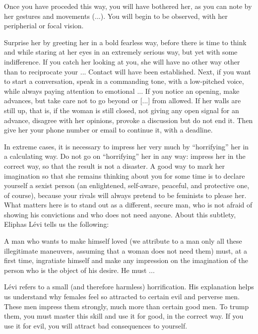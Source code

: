 \par Once you have proceded this way, you will have bothered her, as you can note by her gestures and movements (...). You will begin to be observed, with her peripherial or focal vision.
 
\par Surprise her by greeting her in a bold fearless way, before there is time to think and while staring at her eyes in an extremely serious way, but yet with some indifference. If you catch her looking at you, she will have no other way other than to reciprocate your ... Contact will have been established. Next, if you want to start a conversation, speak in a commanding tone, with a low-pitched voice, while always paying attention to emotional ... If you notice an opening, make advances, but take care not to go beyond or [...] from allowed. If her walls are still up, that is, if the woman is still closed, not giving any open signal for an advance, disagree with her opinions, provoke a discussion but do not end it. Then give her your phone number or email to continue it, with a deadline.
 
\par In extreme cases, it is necessary to impress her very much by \enquote{horrifying} her in a calculating way. Do not go on \enquote{horrifying} her in any way: impress her in the correct way, so that the result is not a disaster. A good way to mark her imagination so that she remains thinking about you for some time is to declare yourself a sexist person (an enlightened, self-aware, peaceful, and protective one, of course), because your rivals will always pretend to be feminists to please her. What matters here is to stand out as a different, secure man, who is not afraid of showing his convictions and who does not need anyone. About this subtlety, Eliphas Lévi tells us the following:

\begin{displayquote}
	A man who wants to make himself loved (we attribute to a man only all these illegitimate maneuvers, assuming that a woman does not need them) must, at a first time, ingratiate himself and make any impression on the imagination of the person who is the object of his desire. He must ...
\end{displayquote}
 
\par Lévi refers to a small (and therefore harmless) horrification. His explanation helps us understand why females feel so attracted to certain evil and perverse men. These men impress them strongly, much more than certain good men. To trump them, you must master this skill and use it for good, in the correct way. If you use it for evil, you will attract bad consequences to yourself.
 
